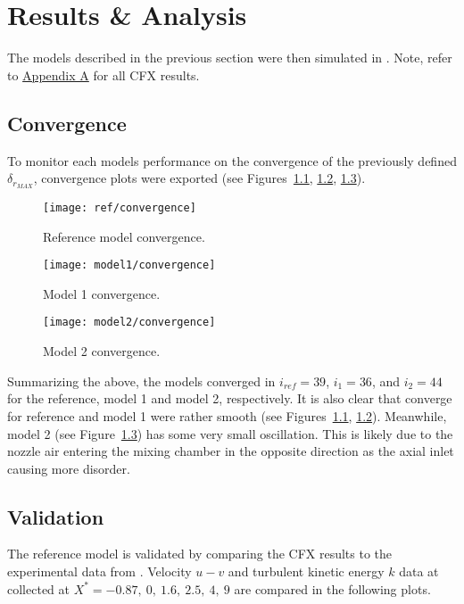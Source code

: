 \chapter{Results \& Analysis}
\label{ch:res}
The models described in the previous section were then simulated in \cite{cfx}. Note, refer to \hyperlink{appendixa}{Appendix A} for all CFX results.

\section{Convergence}
\label{sec:convg}

To monitor each models performance on the convergence of the previously defined $\delta_{r_{MAX}}$, convergence plots were exported (see Figures~\ref{fig:ref_convg}, \ref{fig:mod1_convg}, \ref{fig:mod2_convg}).

\begin{figure}[H]
	\centering
	\texttt{[image: ref/convergence]}
	\caption{Reference model convergence.}
	\label{fig:ref_convg}
\end{figure}
\begin{figure}[H]
	\centering
	\texttt{[image: model1/convergence]}
	\caption{Model 1 convergence.}
	\label{fig:mod1_convg}
\end{figure}
\begin{figure}[H]
	\centering
	\texttt{[image: model2/convergence]}
	\caption{Model 2 convergence.}
	\label{fig:mod2_convg}
\end{figure}

Summarizing the above, the models converged in $i_{ref}=39$, $i_1=36$, and $i_2=44$ for the reference, model 1 and model 2, respectively. It is also clear that converge for reference and model 1 were rather smooth (see Figures~\ref{fig:ref_convg}, \ref{fig:mod1_convg}). Meanwhile, model 2 (see Figure~\ref{fig:mod2_convg}) has some very small oscillation. This is likely due to the nozzle air entering the mixing chamber in the opposite direction as the axial inlet causing more disorder.

\section{Validation}
\label{sec:valid}
The reference model is validated by comparing the CFX results to the experimental data from \cite{art}. Velocity $u-v$ and turbulent kinetic energy $k$ data at collected at $X^*=-0.87,\ 0,\ 1.6,\ 2.5,\ 4,\ 9$ are compared in the following plots.\\

